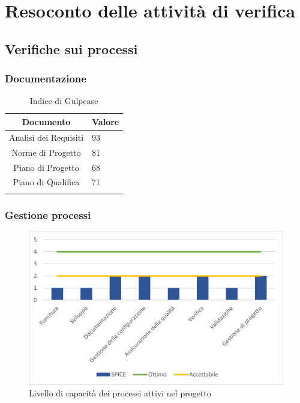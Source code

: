 \appendix
\section{Resoconto delle attività di verifica}
\subsection{Verifiche sui processi}

\subsubsection{Documentazione}


\begin{table}[H]
	\centering
	\renewcommand\tabularxcolumn[1]{>{\Centering}m{#1}}
	\begin{tabularx}{\textwidth}{| c | X |} 
	\hline
	\textbf{Documento} & \textbf{Valore}\\
	\hline
	Analisi dei Requisiti & 93 \\
    \hline
	Norme di Progetto & 81\\
	\hline
	Piano di Progetto & 68\\
	\hline
	Piano di Qualifica & 71\\
	\hline
    	\caption{Indice di Gulpease}
	\end{tabularx}
\end{table}
\subsubsection{Gestione processi}
\begin{figure}[H]
	\centering
	\includegraphics[scale=1.1]{img/SPICE.png}
	\caption{Livello di capacità dei processi attivi nel progetto}
\end{figure}
